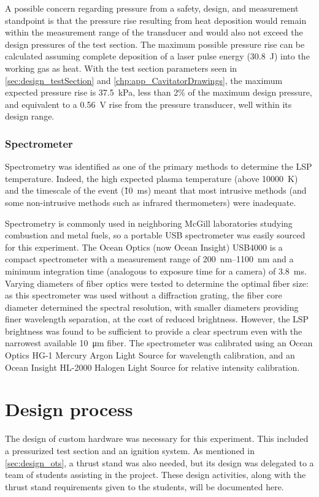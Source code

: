                 A possible concern regarding pressure from a safety, design, and measurement standpoint is that the pressure rise resulting from heat deposition would remain within the measurement range of the transducer and would also not exceed the design pressures of the test section. The maximum possible pressure rise can be calculated assuming complete deposition of a laser pulse energy (\qty{30.8}{J}) into the working gas as heat. With the test section parameters seen in \autoref{sec:design_testSection} and \autoref{chp:app_CavitatorDrawings}, the maximum expected pressure rise is \qty{37.5}{kPa}, less than 2\% of the maximum design pressure, and equivalent to a \qty{0.56}{V} rise from the pressure transducer, well within its design range.

            \subsubsection*{Spectrometer}
                Spectrometry was identified as one of the primary methods to determine the LSP temperature. Indeed, the high expected plasma temperature (above \qty{10000}{K}) and the timescale of the event (\~10~ms) meant that most intrusive methods (and some non-intrusive methods such as infrared thermometers) were inadequate.

                Spectrometry is commonly used in neighboring McGill laboratories studying combustion and metal fuels, so a portable USB spectrometer was easily sourced for this experiment. The Ocean Optics (now Ocean Insight) USB4000 \cite{oceanopticsUSB4000FiberOptic2008} is a compact spectrometer with a measurement range of \qtyrange{200}{1100}{nm} and a minimum integration time (analogous to exposure time for a camera) of 3.8~ms. Varying diameters of fiber optics were tested to determine the optimal fiber size: as this spectrometer was used without a diffraction grating, the fiber core diameter determined the spectral resolution, with smaller diameters providing finer wavelength separation, at the cost of reduced brightness. However, the LSP brightness was found to be sufficient to provide a clear spectrum even with the narrowest available \qty{10}{\um} fiber. The spectrometer was calibrated using an Ocean Optics HG-1 Mercury Argon Light Source for wavelength calibration, and an Ocean Insight HL-2000 Halogen Light Source for relative intensity calibration.

    \section{Design process}
        The design of custom hardware was necessary for this experiment. This included a pressurized test section and an ignition system. As mentioned in \autoref{sec:design_ots}, a thrust stand was also needed, but its design was delegated to a team of students assisting in the project. These design activities, along with the thrust stand requirements given to the students, will be documented here.

